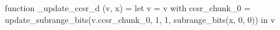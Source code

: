 function _update_ccsr_d (v, x) = let v = { v with ccsr_chunk_0 = update_subrange_bits(v.ccsr_chunk_0, 1, 1, subrange_bits(x, 0, 0)) } in
  v

